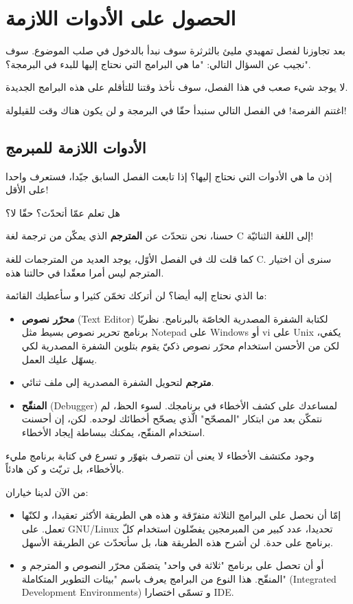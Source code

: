 \chapter{الحصول على الأدوات اللازمة}

بعد تجاوزنا لفصل تمهيدي مليئ بالثرثرة سوف نبدأ بالدخول في صلب الموضوع. سوف نجيب عن السؤال التالي: "ما هي البرامج التي نحتاج إليها للبدء في البرمجة؟".

لا يوجد شيء صعب في هذا الفصل، سوف نأخذ وقتنا للتأقلم على هذه البرامج الجديدة.

اغتنم الفرصة! في الفصل التالي سنبدأ حقّا في البرمجة و لن يكون هناك وقت للقيلولة!

\section{الأدوات اللازمة للمبرمج}

إذن ما هي الأدوات التي نحتاج إليها؟
إذا تابعت الفصل السابق جيّدا، فستعرف واحدا على الأقل!

هل تعلم عمّا أتحدّث؟ حقّا لا؟

حسنا، نحن نتحدّث عن
\textbf{المترجم}
الذي يمكّن من ترجمة لغة \textenglish{C}
إلى اللغة الثنائيّة!

كما قلت لك في الفصل الأوّل، يوجد العديد من المترجمات للغة \textenglish{C}.
سنرى أن اختيار المترجم ليس أمرا معقّدا في حالتنا هذه.

ما الذي نحتاج إليه أيضا؟ لن أتركك تخمّن كثيرا و سأعطيك القائمة:

\begin{itemize}
  \item \textbf{محرّر نصوص }
(\textenglish{Text Editor})
لكتابة الشفرة المصدرية الخاصّة بالبرنامح. نظريّا برنامج تحرير نصوص بسيط مثل
\textenglish{Notepad}
على
\textenglish{Windows}
أو
\textenglish{vi}
على
\textenglish{Unix}
يكفي، لكن من الأحسن استخدام محرّر نصوص ذكيّ يقوم بتلوين الشفرة المصدرية لكي يسهّل عليك العمل.
  \item \textbf{مترجم}
  لتحويل الشفرة المصدرية إلى ملف ثنائي.
  \item \textbf{المنقّح}
(\textenglish{Debugger})
لمساعدك على كشف الأخطاء في برنامجك. لسوء الحظ، لم نتمكّن بعد من ابتكار "المصحّح" الّذي يصحّح أخطائك لوحده. لكن، إن أحسنت استخدام المنقّح، يمكنك ببساطة إيجاد الأخطاء.
\end{itemize}

وجود مكتشف الأخطاء لا يعنى أن تتصرف بتهوّر و تسرع في كتابة برنامج مليء بالأخطاء، بل تريّث و كن هادئاً.

من الآن لدينا خياران:

\begin{itemize}
  \item إمّا أن نحصل على البرامج الثلاثة متفرّقة و هذه هي الطريقة الأكثر تعقيدا، و لكنّها تعمل. على
\textenglish{GNU/Linux}
تحديدا، عدد كبير من المبرمجين يفضّلون استخدام كلّ برنامج على حدة. لن أشرح هذه الطريقة هنا، بل سأتحدّث عن الطريقة الأسهل.
  \item أو أن تحصل على برنامج "ثلاثة في واحد" يتضمّن محرّر النصوص و المترجم و المنقّح. هذا النوع من البرامج يعرف باسم "بيئات التطوير المتكاملة"
(\textenglish{Integrated Development Environments})
و تسمّى اختصارا
\textenglish{IDE}.
\end{itemize}

